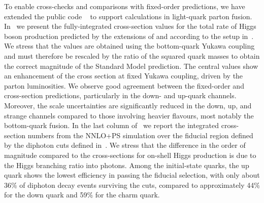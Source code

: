 \documentclass[11pt,a4paper]{article}
\begin{document}
To enable cross-checks and comparisons with fixed-order predictions, we have extended the public code \SuSHi{}~\cite{Harlander:2012pb,Harlander:2003ai} to support calculations in light-quark parton fusion. In~ we present the fully-integrated cross-section values for the total rate of Higgs boson production predicted by the extensions of \SuSHi{} and \minnlo{} according to the setup in~. We stress that the values are obtained using the bottom-quark Yukawa coupling and must therefore be rescaled by the ratio of the squared quark masses to obtain the correct magnitude of the Standard Model prediction. The central values show an enhancement of the cross section at fixed Yukawa coupling, driven by the parton luminosities. We observe good agreement between the fixed-order and \minnlo{} cross-section predictions, particularly in the down- and up-quark channels. Moreover, the scale uncertainties are significantly reduced in the down, up, and strange channels compared to those involving heavier flavours, most notably the bottom-quark fusion. In the last column of~ we report the integrated cross-section numbers from the NNLO+PS simulation over the fiducial region defined by the diphoton cuts defined in~. We stress that the difference in the order of magnitude compared to the cross-sections for on-shell Higgs production is due to the Higgs branching ratio into photons. Among the initial-state quarks, the up quark shows the lowest efficiency in passing the fiducial selection, with only about 36\% of diphoton decay events surviving the cuts, compared to approximately 44\% for the down quark and 59\% for the charm quark.
\end{document}
